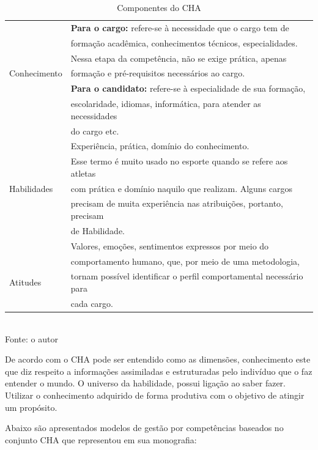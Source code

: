 \begin{table}[htbp]
	\centering
	\caption{Componentes do CHA}
	\label{tab:exTabela}
	\begin{tabular}{l|l}

		\hline
		& \textbf{Para o cargo:} refere-se à necessidade que o cargo tem de\\
		& formação acadêmica, conhecimentos técnicos, especialidades.\\
		& Nessa etapa da competência, não se exige prática, apenas \\
		Conhecimento     & formação e pré-requisitos necessários ao cargo.\\
		& \textbf{Para o candidato:} refere-se à especialidade de sua formação,\\
		& escolaridade, idiomas, informática, para atender as necessidades \\
		& do cargo etc. \\
		\hline
		& Experiência, prática, domínio do conhecimento.\\
		& Esse termo é muito usado no esporte quando se refere aos atletas\\
		Habilidades & com prática e domínio naquilo que realizam. Alguns cargos   \\
		& precisam de muita experiência nas atribuições, portanto, precisam \\
		& de Habilidade.\\
		\hline
		& Valores, emoções, sentimentos expressos por meio do\\
		& comportamento humano, que, por meio de uma metodologia, \\
		Atitudes    & tornam possível identificar o perfil comportamental necessário para    \\
		& cada cargo. \\
		\hline

		\end{tabular}\\
	\vspace{2mm}
 \footnotesize Fonte: o autor
\end{table}

De acordo com  o CHA pode ser entendido como as dimensões, conhecimento este que diz respeito a informações assimiladas e estruturadas pelo indivíduo que o faz entender o mundo. O universo da habilidade, possui ligação ao saber fazer. Utilizar o conhecimento adquirido de forma produtiva com o objetivo de atingir um propósito.

Abaixo são apresentados modelos de gestão por competências baseados no conjunto CHA que  representou em sua monografia:

